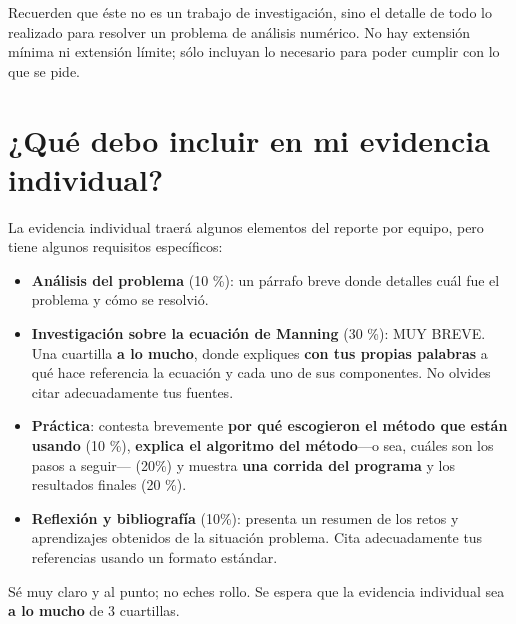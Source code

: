 \documentclass[]{article}
\theoremstyle{definition}
\begin{document}
Recuerden que éste no es un trabajo de investigación, sino el detalle de todo lo realizado para resolver un problema de análisis numérico.
No hay extensión mínima ni extensión límite; sólo incluyan lo necesario para poder cumplir con lo que se pide.

\pagebreak

\section{¿Qué debo incluir en mi evidencia individual?}

La evidencia individual traerá algunos elementos del reporte por equipo, pero tiene algunos requisitos específicos:

\begin{itemize}
    \item \textbf{Análisis del problema} (10 \%): un párrafo breve donde detalles cuál fue el problema y cómo se resolvió.
    \item \textbf{Investigación sobre la ecuación de Manning} (30 \%): MUY BREVE. Una cuartilla \textbf{a lo mucho}, donde expliques \textbf{con tus propias palabras} a qué hace referencia la ecuación y cada uno de sus componentes. No olvides citar adecuadamente tus fuentes.
    \item \textbf{Práctica}: contesta brevemente \textbf{por qué escogieron el método que están usando} (10 \%), \textbf{explica el algoritmo del método}---o sea, cuáles son los pasos a seguir--- (20\%) y muestra \textbf{una corrida del programa} y los resultados finales (20 \%).
    \item \textbf{Reflexión y bibliografía} (10\%): presenta un resumen de los retos y aprendizajes obtenidos de la situación problema. Cita adecuadamente tus referencias usando un formato estándar.
\end{itemize}

Sé muy claro y al punto; no eches rollo. Se espera que la evidencia individual sea \textbf{a lo mucho} de 3 cuartillas.
\end{document}
